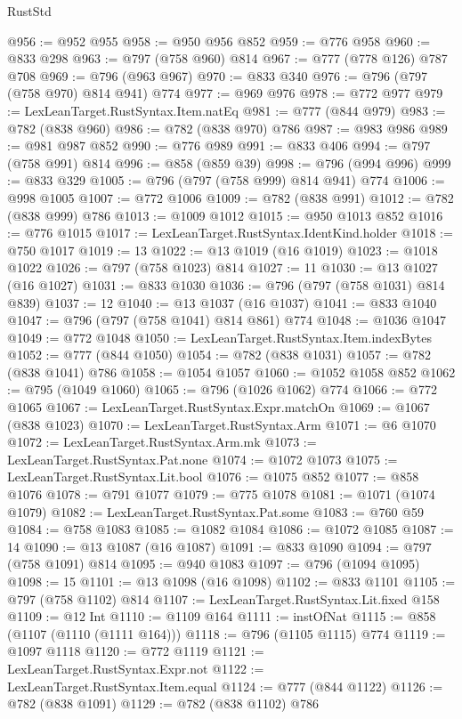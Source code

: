\begin{lexlean}{RustStd}
\begin{coremodule}
@956 := @952 @955
@958 := @950 @956 @852
@959 := @776 @958
@960 := @833 @298
@963 := @797 (@758 @960) @814
@967 := @777 (@778 @126) @787 @708
@969 := @796 (@963 @967)
@970 := @833 @340
@976 := @796 (@797 (@758 @970) @814 @941) @774
@977 := @969 @976
@978 := @772 @977
@979 := LexLeanTarget.RustSyntax.Item.natEq
@981 := @777 (@844 @979)
@983 := @782 (@838 @960)
@986 := @782 (@838 @970) @786
@987 := @983 @986
@989 := @981 @987 @852
@990 := @776 @989
@991 := @833 @406
@994 := @797 (@758 @991) @814
@996 := @858 (@859 @39)
@998 := @796 (@994 @996)
@999 := @833 @329
@1005 := @796 (@797 (@758 @999) @814 @941) @774
@1006 := @998 @1005
@1007 := @772 @1006
@1009 := @782 (@838 @991)
@1012 := @782 (@838 @999) @786
@1013 := @1009 @1012
@1015 := @950 @1013 @852
@1016 := @776 @1015
@1017 := LexLeanTarget.RustSyntax.IdentKind.holder
@1018 := @750 @1017
@1019 := 13
@1022 := @13 @1019 (@16 @1019)
@1023 := @1018 @1022
@1026 := @797 (@758 @1023) @814
@1027 := 11
@1030 := @13 @1027 (@16 @1027)
@1031 := @833 @1030
@1036 := @796 (@797 (@758 @1031) @814 @839)
@1037 := 12
@1040 := @13 @1037 (@16 @1037)
@1041 := @833 @1040
@1047 := @796 (@797 (@758 @1041) @814 @861) @774
@1048 := @1036 @1047
@1049 := @772 @1048
@1050 := LexLeanTarget.RustSyntax.Item.indexBytes
@1052 := @777 (@844 @1050)
@1054 := @782 (@838 @1031)
@1057 := @782 (@838 @1041) @786
@1058 := @1054 @1057
@1060 := @1052 @1058 @852
@1062 := @795 (@1049 @1060)
@1065 := @796 (@1026 @1062) @774
@1066 := @772 @1065
@1067 := LexLeanTarget.RustSyntax.Expr.matchOn
@1069 := @1067 (@838 @1023)
@1070 := LexLeanTarget.RustSyntax.Arm
@1071 := @6 @1070
@1072 := LexLeanTarget.RustSyntax.Arm.mk
@1073 := LexLeanTarget.RustSyntax.Pat.none
@1074 := @1072 @1073
@1075 := LexLeanTarget.RustSyntax.Lit.bool
@1076 := @1075 @852
@1077 := @858 @1076
@1078 := @791 @1077
@1079 := @775 @1078
@1081 := @1071 (@1074 @1079)
@1082 := LexLeanTarget.RustSyntax.Pat.some
@1083 := @760 @59
@1084 := @758 @1083
@1085 := @1082 @1084
@1086 := @1072 @1085
@1087 := 14
@1090 := @13 @1087 (@16 @1087)
@1091 := @833 @1090
@1094 := @797 (@758 @1091) @814
@1095 := @940 @1083
@1097 := @796 (@1094 @1095)
@1098 := 15
@1101 := @13 @1098 (@16 @1098)
@1102 := @833 @1101
@1105 := @797 (@758 @1102) @814
@1107 := LexLeanTarget.RustSyntax.Lit.fixed @158
@1109 := @12 Int
@1110 := @1109 @164
@1111 := instOfNat
@1115 := @858 (@1107 (@1110 (@1111 @164)))
@1118 := @796 (@1105 @1115) @774
@1119 := @1097 @1118
@1120 := @772 @1119
@1121 := LexLeanTarget.RustSyntax.Expr.not
@1122 := LexLeanTarget.RustSyntax.Item.equal
@1124 := @777 (@844 @1122)
@1126 := @782 (@838 @1091)
@1129 := @782 (@838 @1102) @786

\end{coremodule}
\end{lexlean}
